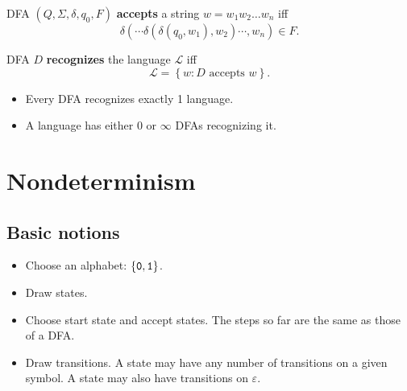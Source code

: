 \documentclass{notes}
\begin{document}
\begin{defn}
  DFA $(Q, \Sigma, \delta, q_{0}, F)$ {\boldmath \bfseries accepts} a string $w = w_1 w_2 \dots w_n$ iff
  \[
    \delta(\cdots \delta(\delta(q_0, w_1), w_2) \cdots, w_n) \in F.
  \]
\end{defn}

\begin{defn}
  DFA $D$ {\boldmath \bfseries recognizes} the language $\mathcal L$ iff 
  \[
    \mathcal L = \left \{ w : \text{$D$ accepts $w$} \right \}.
  \]
\end{defn}

\begin{note}
  \begin{itemize}
    \item Every DFA recognizes exactly 1 language.

    \item A language has either 0 or $\infty$ DFAs recognizing it.
  \end{itemize}
\end{note}

\newpage

\section{Nondeterminism}

\subsection{Basic notions}

\begin{eg}
  \begin{center}
  \end{center}

  \begin{itemize}
    \item Choose an alphabet: $\left \{ \verb~0~, \verb~1~ \right \}$.

    \item Draw states.
      
    \item Choose start state and accept states.
    The steps so far are the same as those of a DFA.
      
    \item Draw transitions.
    A state may have any number of transitions on a given symbol.
    A state may also have transitions on $\varepsilon$.
  \end{itemize}
\end{eg}
\end{document}
